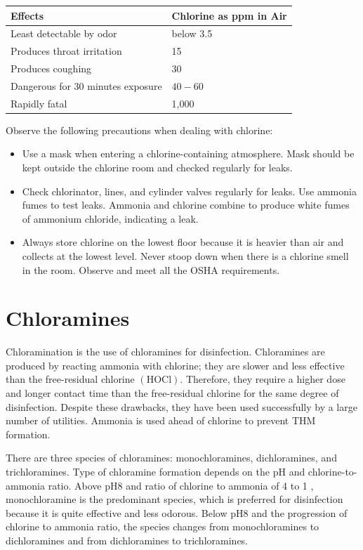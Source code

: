 \documentclass[10pt]{article}
\begin{document}
\begin{tabular}{|l|l|}
\hline
Effects & Chlorine as ppm in Air \\
\hline
Least detectable by odor & below 3.5 \\
\hline
Produces throat irritation & 15 \\
\hline
Produces coughing & 30 \\
\hline
Dangerous for 30 minutes exposure & $40-60$ \\
\hline
Rapidly fatal & 1,000 \\
\hline
\end{tabular}

Observe the following precautions when dealing with chlorine:

\begin{itemize}
  \item Use a mask when entering a chlorine-containing atmosphere. Mask should be kept outside the chlorine room and checked regularly for leaks.

  \item Check chlorinator, lines, and cylinder valves regularly for leaks. Use ammonia fumes to test leaks. Ammonia and chlorine combine to produce white fumes of ammonium chloride, indicating a leak.

  \item Always store chlorine on the lowest floor because it is heavier than air and collects at the lowest level. Never stoop down when there is a chlorine smell in the room. Observe and meet all the OSHA requirements.

\end{itemize}
\section{Chloramines}
Chloramination is the use of chloramines for disinfection. Chloramines are produced by reacting ammonia with chlorine; they are slower and less effective than the free-residual chlorine $(\mathrm{HOCl})$. Therefore, they require a higher dose and longer contact time than the free-residual chlorine for the same degree of disinfection. Despite these drawbacks, they have been used successfully by a large number of utilities. Ammonia is used ahead of chlorine to prevent THM formation.

There are three species of chloramines: monochloramines, dichloramines, and trichloramines. Type of chloramine formation depends on the $\mathrm{pH}$ and chlorine-to-ammonia ratio. Above $\mathrm{pH} 8$ and ratio of chlorine to ammonia of 4 to 1 , monochloramine is the predominant species, which is preferred for disinfection because it is quite effective and less odorous. Below $\mathrm{pH} 8$ and the progression of chlorine to ammonia ratio, the species changes from monochloramines to dichloramines and from dichloramines to trichloramines.
\end{document}
